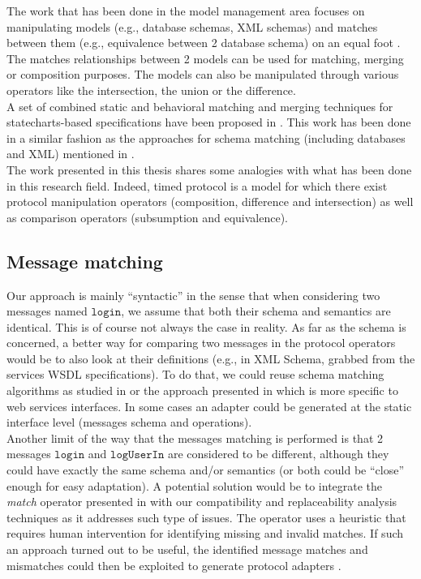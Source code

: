 The work that has been done in the model management area focuses on manipulating models (e.g., database schemas, XML schemas) and matches between them (e.g., equivalence between 2 database schema) on an equal foot \cite{BMPQ-SGR04}. The matches relationships between 2 models can be used for matching, merging or composition purposes. The models can also be manipulated through various operators like the intersection, the union or the difference.\\

A set of combined static and behavioral matching and merging techniques for statecharts-based specifications have been proposed in \cite{NSEZ-ICSE07}. This work has been done in a similar fashion as the approaches for schema matching (including databases and XML) mentioned in \cite{ERPB-VLDBJ01,BMPQ-SGR04}.\\

The work presented in this thesis shares some analogies with what has been done in this research field. Indeed, timed protocol is a model for which there exist protocol manipulation operators (composition, difference and intersection) as well as comparison operators (subsumption and equivalence).


\subsection{Message matching}

Our approach is mainly ``syntactic'' in the sense that when considering two messages named $\mathtt{login}$, we assume that both their schema and semantics are identical. This is of course not always the case in reality. As far as the schema is concerned, a better way for comparing two messages in the protocol operators would be to also look at their definitions (e.g., in XML Schema, grabbed from the services WSDL specifications). To do that, we could reuse schema matching algorithms as studied in \cite{ERPB-VLDBJ01,BMPQ-SGR04} or the approach presented in \cite{DongHMNZ04} which is more specific to web services interfaces. In some cases an adapter could be generated at the static interface level (messages schema and operations). \\

Another limit of the way that the messages matching is performed is that 2 messages $\mathtt{login}$ and $\mathtt{logUserIn}$ are considered to be different, although they could have exactly the same schema and/or semantics (or both could be ``close'' enough for easy adaptation). A potential solution would be to integrate the \emph{match} operator presented in \cite{NSEZ-ICSE07} with our compatibility and replaceability analysis techniques as it addresses such type of issues. The operator uses a heuristic that requires human intervention for identifying missing and invalid matches. If such an approach turned out to be useful, the identified message matches and mismatches could then be exploited to generate protocol adapters \cite{BenatallahCGNT05,MBMCC-WWW07}.

